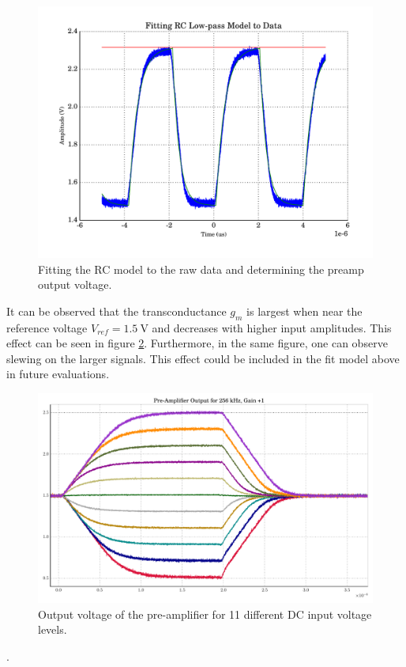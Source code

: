 \begin{figure}
    \centering
    \includegraphics[width=\linewidth]{images/plots/fitting_rc_model.pdf}
    \caption{Fitting the RC model to the raw data and determining the preamp output voltage.}
    \label{fig:fitting_rc_model}
\end{figure}

It can be observed that the transconductance $g_m$ is largest  when  near  the
reference  voltage $V_{ref}=\SI{1.5}{\volt}$ and decreases with  higher  input
amplitudes. This effect  can  be  seen  in figure \ref{fig:preamp_11_signals}.
Furthermore, in the  same  figure,  one  can  observe  slewing  on  the larger
signals.  This  effect  could  be included in the fit model  above  in  future
evaluations.

\begin{figure}
    \centering
    \includegraphics[width=\linewidth]{images/plots/vinComparisonPreamp.pdf}
    \caption{Output voltage of the pre-amplifier for 11 different DC input voltage levels.}
    \label{fig:preamp_11_signals}
\end{figure}
. 

